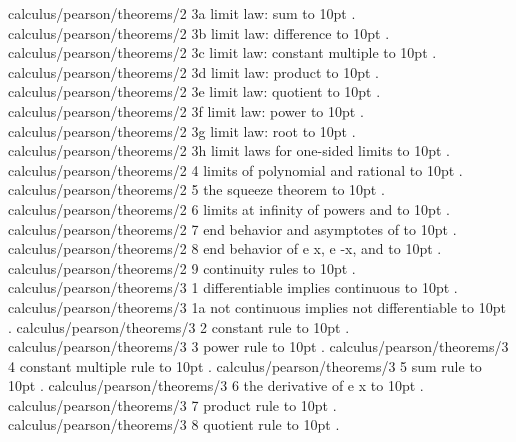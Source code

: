 \smallskip
calculus/pearson/theorems/2 3a limit law: sum \leaders\hbox to 10pt {\hss.\hss}  \hfill {}
\smallskip
calculus/pearson/theorems/2 3b limit law: difference \leaders\hbox to 10pt {\hss.\hss}  \hfill {}
\smallskip
calculus/pearson/theorems/2 3c limit law: constant multiple \leaders\hbox to 10pt {\hss.\hss}  \hfill {}
\smallskip
calculus/pearson/theorems/2 3d limit law: product \leaders\hbox to 10pt {\hss.\hss}  \hfill {}
\smallskip
calculus/pearson/theorems/2 3e limit law: quotient \leaders\hbox to 10pt {\hss.\hss}  \hfill {}
\smallskip
calculus/pearson/theorems/2 3f limit law: power \leaders\hbox to 10pt {\hss.\hss}  \hfill {}
\smallskip
calculus/pearson/theorems/2 3g limit law: root \leaders\hbox to 10pt {\hss.\hss}  \hfill {}
\smallskip
calculus/pearson/theorems/2 3h limit laws for one-sided limits \leaders\hbox to 10pt {\hss.\hss}  \hfill {}
\smallskip
calculus/pearson/theorems/2 4 limits of polynomial and rational \leaders\hbox to 10pt {\hss.\hss}  \hfill {}
\smallskip
calculus/pearson/theorems/2 5 the squeeze theorem \leaders\hbox to 10pt {\hss.\hss}  \hfill {}
\smallskip
calculus/pearson/theorems/2 6 limits at infinity of powers and \leaders\hbox to 10pt {\hss.\hss}  \hfill {}
\smallskip
calculus/pearson/theorems/2 7 end behavior and asymptotes of \leaders\hbox to 10pt {\hss.\hss}  \hfill {}
\smallskip
calculus/pearson/theorems/2 8 end behavior of e x, e {-x}, and \leaders\hbox to 10pt {\hss.\hss}  \hfill {}
\smallskip
calculus/pearson/theorems/2 9 continuity rules \leaders\hbox to 10pt {\hss.\hss}  \hfill {}
\smallskip
calculus/pearson/theorems/3 1 differentiable implies continuous \leaders\hbox to 10pt {\hss.\hss}  \hfill {}
\smallskip
calculus/pearson/theorems/3 1a not continuous implies not differentiable \leaders\hbox to 10pt {\hss.\hss}  \hfill {}
\smallskip
calculus/pearson/theorems/3 2 constant rule \leaders\hbox to 10pt {\hss.\hss}  \hfill {}
\smallskip
calculus/pearson/theorems/3 3 power rule \leaders\hbox to 10pt {\hss.\hss}  \hfill {}
\smallskip
calculus/pearson/theorems/3 4 constant multiple rule \leaders\hbox to 10pt {\hss.\hss}  \hfill {}
\smallskip
calculus/pearson/theorems/3 5 sum rule \leaders\hbox to 10pt {\hss.\hss}  \hfill {}
\smallskip
calculus/pearson/theorems/3 6 the derivative of e x \leaders\hbox to 10pt {\hss.\hss}  \hfill {}
\smallskip
calculus/pearson/theorems/3 7 product rule \leaders\hbox to 10pt {\hss.\hss}  \hfill {}
\smallskip
calculus/pearson/theorems/3 8 quotient rule \leaders\hbox to 10pt {\hss.\hss}  \hfill {}
